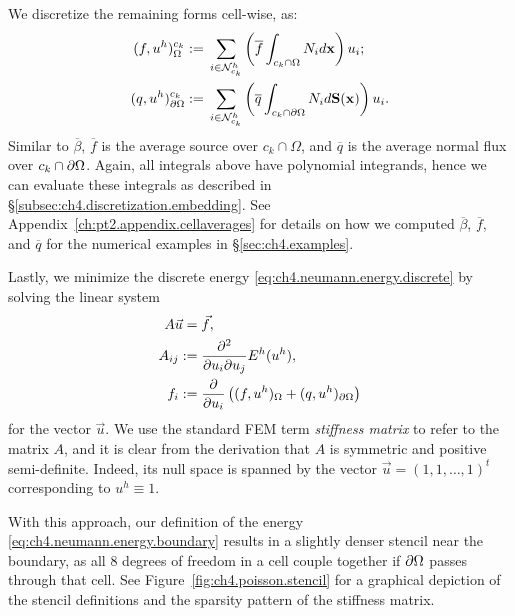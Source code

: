 We discretize the remaining forms cell-wise, as:
\begin{align*}
(f, u^h)^{c_k}_{\Omega} := {} & \sum_{i \in \mathcal{N}^h_{c_k}} \left( \overline{f} \int_{c_k \cap \Omega} N_i d\mathbf{x} \right) u_i; \\
(q, u^h)^{c_k}_{\partial\Omega} := {} & \sum_{i \in \mathcal{N}^h_{c_k}} \left( \overline{q} \int_{c_k \cap \partial\Omega} N_i d\mathbf{S}(\mathbf{x}) \right) u_i.
\end{align*}
Similar to $\overline{\beta}$, $\overline{f}$ is the average source over $c_k \cap \Omega$, and $\overline{q}$ is the average normal flux over $c_k \cap \partial\Omega$. Again, all integrals above have polynomial integrands, hence we can evaluate these integrals as described in \S\ref{subsec:ch4.discretization.embedding}. See Appendix~\ref{ch:pt2.appendix.cellaverages} for details on how we computed $\overline{\beta}$, $\overline{f}$, and $\overline{q}$ for the numerical examples in \S\ref{sec:ch4.examples}.

Lastly, we minimize the discrete energy \eqref{eq:ch4.neumann.energy.discrete} by solving the linear system
\begin{equation} \label{eq:ch4.neumann.linear.system}
\begin{split}
A \vec{u} = {} & \vec{f}, \\
A_{ij} := {} & \frac{\partial^2 }{\partial u_i \partial u_j} E^h(u^h), \\
f_i := {} & \frac{\partial }{\partial u_i} \left( (f, u^h)_{\Omega} + (q, u^h)_{\partial\Omega} \right)
\end{split}
\end{equation}
for the vector $\vec{u}$. We use the standard FEM term \emph{stiffness matrix} to refer to the matrix $A$, and it is clear from the derivation that $A$ is symmetric and positive semi-definite. Indeed, its null space is spanned by the vector $\vec{u} = (1, 1, \dotsc, 1)^t$ corresponding to $u^h \equiv 1$.

With this approach, our definition of the energy \eqref{eq:ch4.neumann.energy.boundary} results in a slightly denser stencil near the boundary, as all $8$ degrees of freedom in a cell couple together if $\partial\Omega$ passes through that cell. See Figure~\ref{fig:ch4.poisson.stencil} for a graphical depiction of the stencil definitions and the sparsity pattern of the stiffness matrix.

